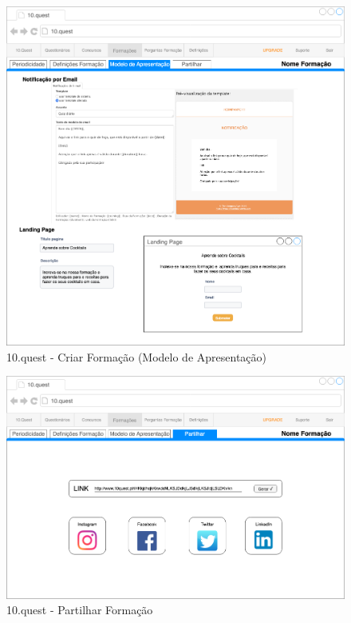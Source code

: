 \begin{figure}[ht!]
	\begin{center}
		\includegraphics[width=1\textwidth]{img/prototipos/11.png}
		\caption{10.quest - Criar Formação (Modelo de Apresentação)}
		\label{10q-}
	\end{center}
\end{figure}

\begin{figure}[ht!]
	\begin{center}
		\includegraphics[width=1\textwidth]{img/prototipos/12.png}
		\caption{10.quest - Partilhar Formação}
		\label{10q-}
	\end{center}
\end{figure}

